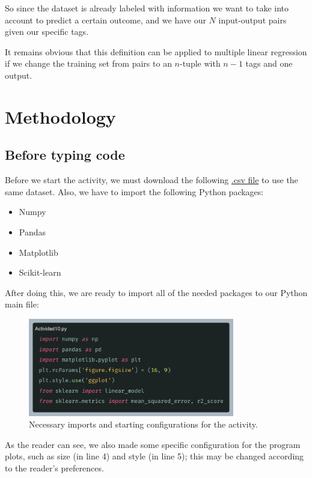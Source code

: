 \documentclass[10pt]{article}
\begin{document}
 \cite{ai}
\vspace{5pt}

So since the dataset is already labeled with information we want to take into account to predict a certain outcome, and we have our $N$ input-output pairs given our specific tags. \par
It remains obvious that this definition can be applied to multiple linear regression if we change the training set from pairs to an $n$-tuple with $n-1$ tags and one output.

\newpage

\section{Methodology}
\subsection{Before typing code}
Before we start the activity, we must download the following \href{http://www.aprendemachinelearning.com/articulos_ml/}{.csv file} \cite{aprendeML} to use the same dataset. Also, we have to import the following Python packages:
\begin{itemize}
  \item Numpy
  \item Pandas
  \item Matplotlib
  \item Scikit-learn
\end{itemize}
After doing this, we are ready to import all of the needed packages to our Python main file: \par
\begin{figure}[h]
  \centering
  \includegraphics[width=90mm]{images/2025-03-25-09-38-02}
  \caption{Necessary imports and starting configurations for the activity.}
\end{figure}
As the reader can see, we also made some specific configuration for the program plots, such as size (in line 4) and style (in line 5); this may be changed according to the reader's preferences.
\end{document}
